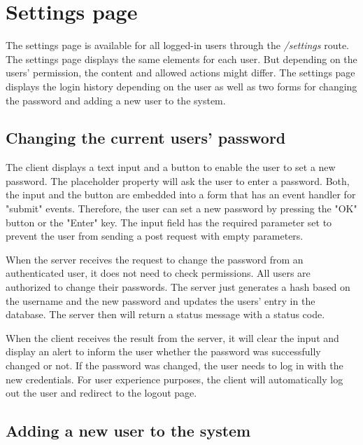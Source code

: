 \section{Settings page}
\label{sec:settings_page}

The settings page is available for all logged-in users through the \textit{/settings} route. The settings page displays the same elements for each user. But depending on the users' permission, the content and allowed actions might differ. The settings page displays the login history depending on the user as well as two forms for changing the password and adding a new user to the system.



\subsection{Changing the current users' password}
\label{subsec:changing_the_current_users_password}

The client displays a text input and a button to enable the user to set a new password. The placeholder property will ask the user to enter a password. Both, the input and the button are embedded into a form that has an event handler for "submit" events. Therefore, the user can set a new password by pressing the "OK" button or the "Enter" key.  The input field has the required parameter set to prevent the user from sending a post request with empty parameters.

When the server receives the request to change the password from an authenticated user, it does not need to check permissions. All users are authorized to change their passwords. The server just generates a hash based on the username and the new password and updates the users' entry in the database. The server then will return a status message with a status code.

When the client receives the result from the server, it will clear the input and display an alert to inform the user whether the password was successfully changed or not. If the password was changed, the user needs to log in with the new credentials. For user experience purposes, the client will automatically log out the user and redirect to the logout page.



\subsection{Adding a new user to the system}
\label{subsec:adding_a_new_user_to_the_system}

